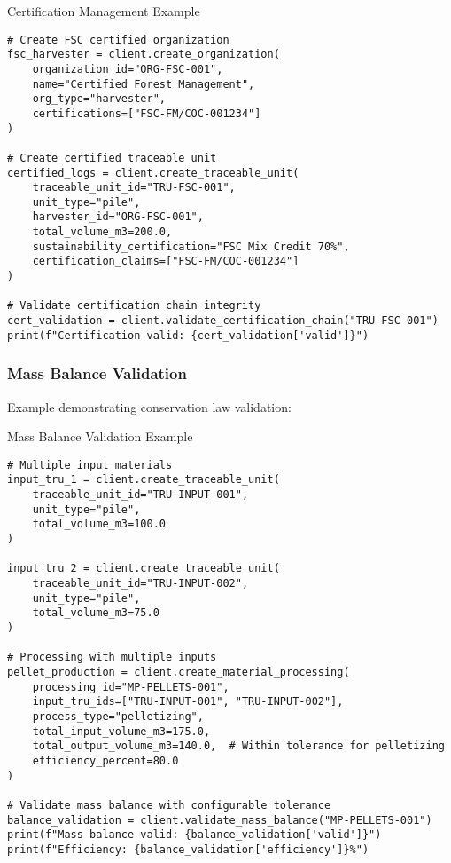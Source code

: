 \begin{pythonexample}{Certification Management Example}
\begin{verbatim}
# Create FSC certified organization
fsc_harvester = client.create_organization(
    organization_id="ORG-FSC-001",
    name="Certified Forest Management",
    org_type="harvester",
    certifications=["FSC-FM/COC-001234"]
)

# Create certified traceable unit
certified_logs = client.create_traceable_unit(
    traceable_unit_id="TRU-FSC-001",
    unit_type="pile",
    harvester_id="ORG-FSC-001",
    total_volume_m3=200.0,
    sustainability_certification="FSC Mix Credit 70%",
    certification_claims=["FSC-FM/COC-001234"]
)

# Validate certification chain integrity
cert_validation = client.validate_certification_chain("TRU-FSC-001")
print(f"Certification valid: {cert_validation['valid']}")
\end{verbatim}
\end{pythonexample}

\subsubsection{Mass Balance Validation}
\label{sec:python-mass-balance}

Example demonstrating conservation law validation:

\begin{pythonexample}{Mass Balance Validation Example}
\begin{verbatim}
# Multiple input materials
input_tru_1 = client.create_traceable_unit(
    traceable_unit_id="TRU-INPUT-001",
    unit_type="pile", 
    total_volume_m3=100.0
)

input_tru_2 = client.create_traceable_unit(
    traceable_unit_id="TRU-INPUT-002",
    unit_type="pile",
    total_volume_m3=75.0
)

# Processing with multiple inputs
pellet_production = client.create_material_processing(
    processing_id="MP-PELLETS-001",
    input_tru_ids=["TRU-INPUT-001", "TRU-INPUT-002"],
    process_type="pelletizing",
    total_input_volume_m3=175.0,
    total_output_volume_m3=140.0,  # Within tolerance for pelletizing
    efficiency_percent=80.0
)

# Validate mass balance with configurable tolerance
balance_validation = client.validate_mass_balance("MP-PELLETS-001")
print(f"Mass balance valid: {balance_validation['valid']}")
print(f"Efficiency: {balance_validation['efficiency']}%")
\end{verbatim}
\end{pythonexample}


